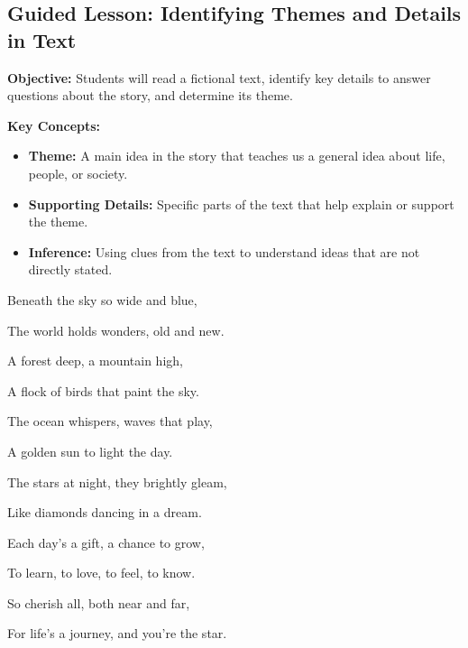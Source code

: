 \documentclass[12pt]{article}
\begin{document}
\subsection*{Guided Lesson: Identifying Themes and Details in Text}
\onehalfspacing

\begin{tcolorbox}[colframe=black!40, colback=gray!5, 
coltitle=black, colbacktitle=black!20, fonttitle=\bfseries\Large, 
title=Learning Objective, halign title=center, left=5pt, right=5pt, top=5pt, bottom=15pt]
\textbf{Objective:} Students will read a fictional text, identify key details to answer questions about the story, and determine its theme.
\end{tcolorbox}

\vspace{1em}

\begin{tcolorbox}[colframe=black!60, colback=white, 
coltitle=black, colbacktitle=black!15, fonttitle=\bfseries\Large, 
title=Key Concepts and Vocabulary, halign title=center, left=10pt, right=10pt, top=10pt, bottom=15pt]
\textbf{Key Concepts:}
\begin{itemize}
    \item \textbf{Theme:} A main idea in the story that teaches us a general idea about life, people, or society. 
    \item \textbf{Supporting Details:} Specific parts of the text that help explain or support the theme.
    \item \textbf{Inference:} Using clues from the text to understand ideas that are not directly stated.
\end{itemize}
\end{tcolorbox}

\vspace{1em}
\begin{tcolorbox}[colframe=black!60, colback=white, 
coltitle=black, colbacktitle=black!15, fonttitle=\bfseries\Large, 
title="Beneath the Sky", halign title=center, left=10pt, right=10pt, top=10pt, bottom=15pt]


Beneath the sky so wide and blue,

The world holds wonders, old and new.

A forest deep, a mountain high,

A flock of birds that paint the sky.

The ocean whispers, waves that play,

A golden sun to light the day.

The stars at night, they brightly gleam,

Like diamonds dancing in a dream.

Each day’s a gift, a chance to grow,

To learn, to love, to feel, to know.

So cherish all, both near and far,

For life’s a journey, and you’re the star.

 
\end{tcolorbox}
\end{document}
